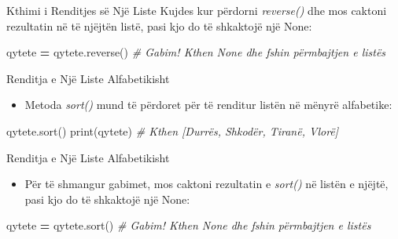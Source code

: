 \documentclass[
  ignorenonframetext,
]{beamer}
\newenvironment{Shaded}{\begin{snugshade}}{\end{snugshade}}
\newcommand{\BuiltInTok}[1]{#1}
\newcommand{\CommentTok}[1]{\textcolor[rgb]{0.56,0.35,0.01}{\textit{#1}}}
\newcommand{\NormalTok}[1]{#1}
\newcommand{\OperatorTok}[1]{\textcolor[rgb]{0.81,0.36,0.00}{\textbf{#1}}}
\providecommand{\tightlist}{%
  \setlength{\itemsep}{0pt}\setlength{\parskip}{0pt}}
\begin{document}
\begin{frame}[fragile]{Kthimi i Renditjes së Një Liste}
\protect\hypertarget{kthimi-i-renditjes-suxeb-njuxeb-liste-1}{}
Kujdes kur përdorni \emph{reverse()} dhe mos caktoni rezultatin në të
njëjtën listë, pasi kjo do të shkaktojë një None:

\begin{Shaded}
\begin{Highlighting}[]
\NormalTok{qytete }\OperatorTok{=}\NormalTok{ qytete.reverse()  }\CommentTok{\# Gabim! Kthen None dhe fshin përmbajtjen e listës}
\end{Highlighting}
\end{Shaded}
\end{frame}

\begin{frame}[fragile]{Renditja e Një Liste Alfabetikisht}
\protect\hypertarget{renditja-e-njuxeb-liste-alfabetikisht}{}
\begin{itemize}
\tightlist
\item
  Metoda \emph{sort()} mund të përdoret për të renditur listën në mënyrë
  alfabetike:
\end{itemize}

\begin{Shaded}
\begin{Highlighting}[]
\NormalTok{qytete.sort()}
\BuiltInTok{print}\NormalTok{(qytete)  }\CommentTok{\# Kthen [\textquotesingle{}Durrës\textquotesingle{}, \textquotesingle{}Shkodër\textquotesingle{}, \textquotesingle{}Tiranë\textquotesingle{}, \textquotesingle{}Vlorë\textquotesingle{}]}
\end{Highlighting}
\end{Shaded}
\end{frame}

\begin{frame}[fragile]{Renditja e Një Liste Alfabetikisht}
\protect\hypertarget{renditja-e-njuxeb-liste-alfabetikisht-1}{}
\begin{itemize}
\tightlist
\item
  Për të shmangur gabimet, mos caktoni rezultatin e \emph{sort()} në
  listën e njëjtë, pasi kjo do të shkaktojë një None:
\end{itemize}

\begin{Shaded}
\begin{Highlighting}[]
\NormalTok{qytete }\OperatorTok{=}\NormalTok{ qytete.sort()  }\CommentTok{\# Gabim! Kthen None dhe fshin përmbajtjen e listës}
\end{Highlighting}
\end{Shaded}
\end{frame}
\end{document}
